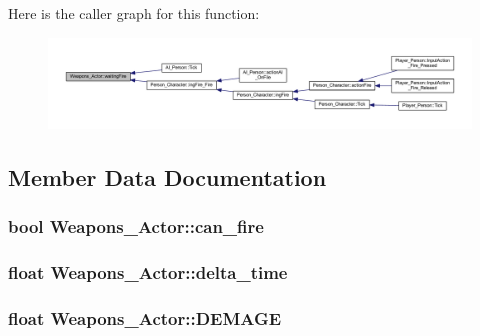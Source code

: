 Here is the caller graph for this function\+:
\nopagebreak
\begin{figure}[H]
\begin{center}
\leavevmode
\includegraphics[width=350pt]{class_weapons___actor_aad412298d60d3ffd391c1e3b925eb206_icgraph}
\end{center}
\end{figure}




\subsection{Member Data Documentation}
\subsubsection[{\texorpdfstring{can\+\_\+fire}{can_fire}}]{\setlength{\rightskip}{0pt plus 5cm}bool Weapons\+\_\+\+Actor\+::can\+\_\+fire\hspace{0.3cm}{\ttfamily [private]}}\hypertarget{class_weapons___actor_a03094917a8513d50bf93da99b09b6295}{}\label{class_weapons___actor_a03094917a8513d50bf93da99b09b6295}
\subsubsection[{\texorpdfstring{delta\+\_\+time}{delta_time}}]{\setlength{\rightskip}{0pt plus 5cm}float Weapons\+\_\+\+Actor\+::delta\+\_\+time\hspace{0.3cm}{\ttfamily [private]}}\hypertarget{class_weapons___actor_a301ddf96a3148e09e550e355d36fbd02}{}\label{class_weapons___actor_a301ddf96a3148e09e550e355d36fbd02}
\subsubsection[{\texorpdfstring{D\+E\+M\+A\+GE}{DEMAGE}}]{\setlength{\rightskip}{0pt plus 5cm}float Weapons\+\_\+\+Actor\+::\+D\+E\+M\+A\+GE}\hypertarget{class_weapons___actor_aea43a4cdbf104cbb2a46112a14488bfd}{}\label{class_weapons___actor_aea43a4cdbf104cbb2a46112a14488bfd}
